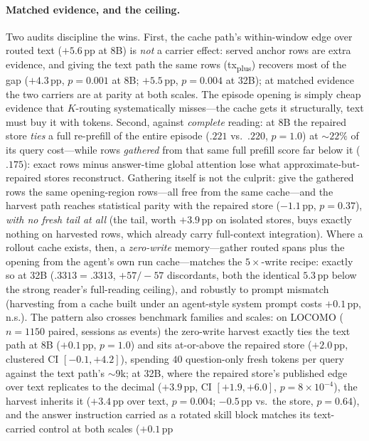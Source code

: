 \documentclass{article} %
\newcommand{\pp}{\,\mathrm{pp}}
\begin{document}
\paragraph{Matched evidence, and the ceiling.} Two audits discipline the wins. First, the
cache path's within-window edge over routed text ($+5.6\pp$ at 8B) is \emph{not} a carrier
effect: served anchor rows are extra evidence, and giving the text path the same rows
(tx\textsubscript{plus}) recovers most of the gap ($+4.3\pp$, $p{=}0.001$ at 8B; $+5.5\pp$,
$p{=}0.004$ at 32B); at matched evidence the two carriers are at parity at both scales. The
episode opening is simply cheap evidence that $K$-routing systematically misses---the cache
gets it structurally, text must buy it with tokens. Second, against \emph{complete} reading:
at 8B the repaired store \emph{ties} a full re-prefill of the entire episode ($.221$ vs.\
$.220$, $p{=}1.0$) at ${\sim}22\%$ of its query cost---while rows \emph{gathered} from that
same full prefill score far below it ($.175$): exact rows minus answer-time global attention
lose what approximate-but-repaired stores reconstruct. Gathering itself is not the culprit:
give the gathered rows the same opening-region rows---all free from the same cache---and the
harvest path reaches statistical parity with the repaired store ($-1.1\pp$, $p{=}0.37$),
\emph{with no fresh tail at all} (the tail, worth $+3.9\pp$ on isolated stores, buys exactly
nothing on harvested rows, which already carry full-context integration). Where a rollout
cache exists, then, a \emph{zero-write} memory---gather routed spans plus the opening from
the agent's own run cache---matches the $5\times$-write recipe: exactly so at 32B
($.3313{=}.3313$, $+57/{-}57$ discordants, both the identical $5.3\pp$ below the strong
reader's full-reading ceiling), and robustly to prompt mismatch (harvesting from a cache
built under an agent-style system prompt costs $+0.1\pp$, n.s.). The pattern also crosses
benchmark families and scales: on LOCOMO ($n{=}1150$ paired, sessions as events) the
zero-write harvest exactly ties the text path at 8B ($+0.1\pp$, $p{=}1.0$) and sits
at-or-above the repaired store ($+2.0\pp$, clustered CI $[-0.1,+4.2]$), spending $40$
question-only fresh tokens per query against the text path's ${\sim}9$k; at 32B, where
the repaired store's published edge over text replicates to the decimal ($+3.9\pp$, CI
$[+1.9,+6.0]$, $p{=}8{\times}10^{-4}$), the harvest inherits it ($+3.4\pp$ over text,
$p{=}0.004$; $-0.5\pp$ vs.\ the store, $p{=}0.64$), and the answer instruction carried
as a rotated skill block matches its text-carried control at both scales ($+0.1\pp$
\end{document}
